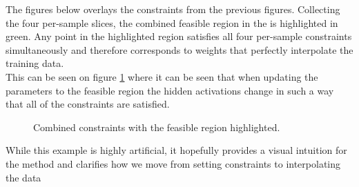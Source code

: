 The figures below overlays the constraints from the previous figures. Collecting the four per-sample slices, the combined feasible region in the  is highlighted in green. Any point in the highlighted region satisfies all four per-sample constraints simultaneously and therefore corresponds to weights that perfectly interpolate the training data.
\\
This can be seen on figure \ref{fig:xor_constraints_combined_w1_wb} where it can be seen that when updating the parameters to the feasible region the hidden activations change in such a way that all of the constraints are satisfied.
\begin{figure}[ht]
\centering
\begin{subfigure}[t]{0.35\textwidth}
\centering

\end{subfigure}
\hfill
\begin{subfigure}[t]{0.4\textwidth}
\centering

\end{subfigure}
\caption{Combined constraints with the feasible region highlighted.}
\label{fig:xor_constraints_combined_w1_wb}

\end{figure}

While this example is highly artificial, it hopefully provides a visual intuition for the method and clarifies how we move from setting constraints to interpolating the data

